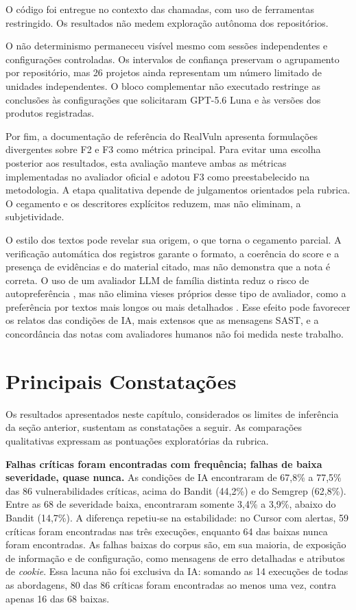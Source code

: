 O código foi entregue no contexto das chamadas, com uso de ferramentas
restringido. Os resultados não medem exploração autônoma dos repositórios.

O não determinismo permaneceu visível mesmo com sessões independentes e
configurações controladas. Os intervalos de confiança preservam o agrupamento
por repositório, mas 26 projetos ainda representam um número limitado de
unidades independentes. O bloco complementar não executado restringe as
conclusões às configurações que solicitaram GPT-5.6 Luna e às versões dos
produtos registradas.

Por fim, a documentação de referência do RealVuln apresenta formulações
divergentes sobre F2 e F3 como métrica principal. Para evitar uma escolha
posterior aos resultados, esta avaliação manteve ambas as métricas implementadas
no avaliador oficial e adotou F3 como preestabelecido na metodologia. A etapa
qualitativa depende de julgamentos orientados pela rubrica. O cegamento e os
descritores explícitos reduzem, mas não eliminam, a subjetividade.

O estilo dos textos pode revelar sua origem, o que torna o cegamento parcial. A
verificação automática dos registros garante o formato, a coerência do score e a
presença de evidências e do material citado, mas não demonstra que a nota é
correta. O uso de um avaliador LLM de família distinta reduz o risco de
autopreferência \cite{Panickssery2024SelfPreference}, mas não elimina vieses
próprios desse tipo de avaliador, como a preferência por textos mais longos ou
mais detalhados \cite{Zheng2023LLMJudge}. Esse efeito pode favorecer os relatos
das condições de IA, mais extensos que as mensagens SAST, e a concordância das
notas com avaliadores humanos não foi medida neste trabalho.

\section{Principais Constatações}\label{sec:constatacoes}

Os resultados apresentados neste capítulo, considerados os limites de
inferência da seção anterior, sustentam as constatações a seguir. As comparações
qualitativas expressam as pontuações exploratórias da rubrica.

\textbf{Falhas críticas foram encontradas com frequência; falhas de baixa
severidade, quase nunca.} As condições de IA encontraram de 67,8\% a 77,5\% das
86 vulnerabilidades críticas, acima do Bandit (44,2\%) e do Semgrep (62,8\%).
Entre as 68 de severidade baixa, encontraram somente 3,4\% a 3,9\%, abaixo do
Bandit (14,7\%). A diferença repetiu-se na estabilidade: no Cursor com alertas,
59 críticas foram encontradas nas três execuções, enquanto 64 das baixas nunca
foram encontradas. As falhas baixas do corpus são, em sua maioria, de exposição
de informação e de configuração, como mensagens de erro detalhadas e atributos
de \textit{cookie}. Essa lacuna não foi exclusiva da IA: somando as 14 execuções
de todas as abordagens, 80 das 86 críticas foram encontradas ao menos uma vez,
contra apenas 16 das 68 baixas.

